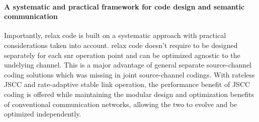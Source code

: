 \paragraph*{A systematic and practical framework for code design and semantic communication}
Importantly, \gls{relax} code is built on a systematic approach with practical considerations taken into account. \gls{relax} code doesn't require to be designed separately for each \gls{snr} operation point and can be optimized agnostic to the undelying channel. This is a major advantage of general separate source-channel coding solutions which was missing in joint source-channel codings. With rateless JSCC and rate-adaptive stable link operation, the performance benefit of JSCC coding is offered while maintaining the modular design and optimization benefits of conventional communication networks, allowing the two to evolve and be optimized independently.



